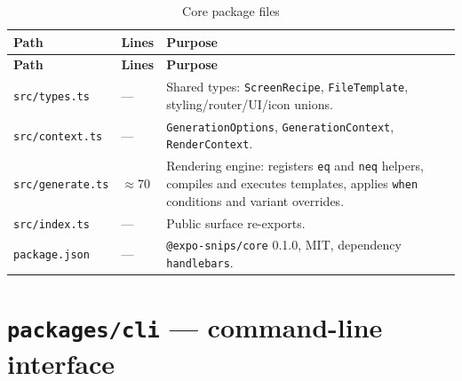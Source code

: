 \begin{longtable}{@{}L{5cm}L{2.2cm}L{7.2cm}@{}}
\caption{Core package files}\\
\toprule
\textbf{Path} & \textbf{Lines} & \textbf{Purpose} \\
\midrule
\endfirsthead
\toprule
\textbf{Path} & \textbf{Lines} & \textbf{Purpose} \\
\midrule
\endhead
\texttt{src/types.ts} & --- & Shared types: \texttt{ScreenRecipe},
\texttt{FileTemplate}, styling/router/UI/icon unions. \\
\texttt{src/context.ts} & --- & \texttt{GenerationOptions},
\texttt{GenerationContext}, \texttt{RenderContext}. \\
\texttt{src/generate.ts} & $\approx$70 & Rendering engine: registers \texttt{eq} and
\texttt{neq} helpers, compiles and executes templates, applies \texttt{when}
conditions and variant overrides. \\
\texttt{src/index.ts} & --- & Public surface re-exports. \\
\texttt{package.json} & --- & \texttt{@expo-snips/core} 0.1.0, MIT, dependency
\texttt{handlebars}. \\
\bottomrule
\end{longtable}

\section{\texttt{packages/cli} --- command-line interface}


